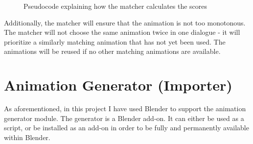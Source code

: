 \begin{figure}[!ht]
\centerline{}
\caption{Pseudocode explaining how the matcher calculates the scores}\label{fig:matcher}
\end{figure}

Additionally, the matcher will ensure that the animation is not too monotonous. The matcher will not choose the same animation twice in one dialogue - it will prioritize a similarly matching animation that has not yet been used. The animations will be reused if no other matching animations are available.


\section{Animation Generator (Importer)}
\label{sec:generatordesign}

As aforementioned, in this project I have used Blender to support the animation generator module. The generator is a Blender add-on.  It can either be used as a script, or be installed as an add-on in order to be fully and permanently available within Blender.

